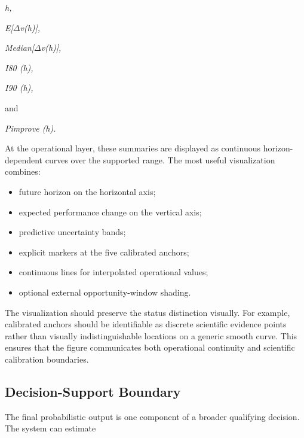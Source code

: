 \begin{center}\textit{h,}\end{center}

\begin{center}\textit{E[\ensuremath{\Delta}v(h)],}\end{center}

\begin{center}\textit{Median[\ensuremath{\Delta}v(h)],}\end{center}

\begin{center}\textit{I80 (h),}\end{center}

\begin{center}\textit{I90 (h),}\end{center}

and

\begin{center}\textit{Pimprove (h).}\end{center}

At the operational layer, these summaries are displayed as continuous horizon-dependent curves over the supported range. The most useful visualization combines:

\begin{itemize}
\item future horizon on the horizontal axis;
\item expected performance change on the vertical axis;
\item predictive uncertainty bands;
\item explicit markers at the five calibrated anchors;
\item continuous lines for interpolated operational values;
\item optional external opportunity-window shading.
\end{itemize}

The visualization should preserve the status distinction visually. For example, calibrated anchors should be identifiable as discrete scientific evidence points rather than visually indistinguishable locations on a generic smooth curve. This ensures that the figure communicates both operational continuity and scientific calibration boundaries.

\subsection{Decision-Support Boundary}
The final probabilistic output is one component of a broader qualifying decision. The system can estimate

